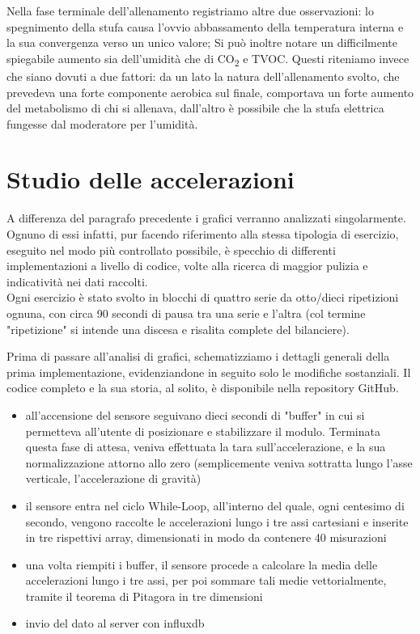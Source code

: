 \documentclass[fleqn,10pt]{SelfArx} %
\begin{document}
Nella fase terminale dell'allenamento registriamo altre due osservazioni: lo spegnimento della 
stufa causa l'ovvio abbassamento della temperatura interna e la sua convergenza verso un unico valore; 
Si può inoltre notare un difficilmente spiegabile aumento sia dell'umidità che di CO\textsubscript{2} e TVOC.
Questi riteniamo invece che siano dovuti a due fattori: da un lato la natura dell'allenamento svolto, 
che prevedeva una forte componente aerobica sul finale, comportava un forte aumento del metabolismo di chi 
si allenava, dall'altro è possibile che la stufa elettrica fungesse dal moderatore per l'umidità.\\

\section{Studio delle accelerazioni}

A differenza del paragrafo precedente i grafici verranno analizzati singolarmente. 
Ognuno di essi infatti, pur facendo riferimento alla stessa tipologia di esercizio, eseguito nel 
modo più controllato possibile, è specchio di differenti implementazioni a livello di codice, volte alla 
ricerca di maggior pulizia e indicatività nei dati raccolti.\\
Ogni esercizio è stato svolto in blocchi di quattro serie da otto/dieci ripetizioni ognuna, con circa 90 
secondi di pausa tra una serie e l'altra (col termine "ripetizione" si intende una discesa e risalita complete 
del bilanciere).

Prima di passare all'analisi di grafici, schematizziamo i dettagli generali della prima implementazione, 
evidenziandone in seguito solo le modifiche sostanziali. Il codice completo e la sua storia, al solito, 
è disponibile nella repository GitHub. 

\begin{itemize}[noitemsep] %
	\item all'accensione del sensore seguivano dieci secondi di "buffer" in cui si permetteva all'utente di 
	posizionare e stabilizzare il modulo. Terminata questa fase di attesa, veniva effettuata la tara 
	sull'accelerazione, e la sua normalizzazione attorno allo zero (semplicemente veniva sottratta lungo 
	l'asse verticale, l'accelerazione di gravità)
	\item il sensore entra nel ciclo While-Loop, all'interno del quale, ogni centesimo di secondo, vengono 
	raccolte le accelerazioni lungo i tre assi cartesiani e inserite in tre rispettivi array, dimensionati in 
	modo da contenere 40 misurazioni
	\item una volta riempiti i buffer, il sensore procede a calcolare la media delle accelerazioni lungo i 
	tre assi, per poi sommare tali medie vettorialmente, tramite il teorema di Pitagora in tre dimensioni
	\item invio del dato al server con influxdb
\end{itemize}
\end{document}
